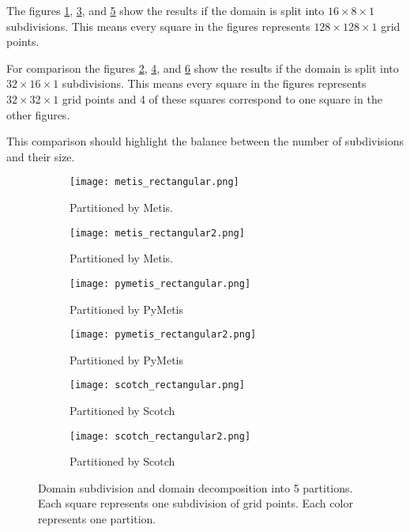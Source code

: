 The figures \ref{fig:metis1}, \ref{fig:pymetis1}, and \ref{fig:scotch1} show the results if the domain is split into $16 \times 8 \times 1$ subdivisions.
This means every square in the figures represents $128 \times 128 \times 1$ grid points.

For comparison the figures \ref{fig:metis2}, \ref{fig:pymetis2}, and \ref{fig:scotch2} show the results if the domain is split into $32 \times 16 \times 1$ subdivisions.
This means every square in the figures represents $32 \times 32 \times 1$ grid points and 4 of these squares correspond to one square in the other figures.

This comparison should highlight the balance between the number of subdivisions and their size.

\begin{figure}[!htbp]
\centering
\begin{subfigure}{0.6\textwidth}
  \centering
  \texttt{[image: metis\_rectangular.png]}
  \caption{Partitioned by Metis.}
  \label{fig:metis1}
\end{subfigure}%
\begin{subfigure}{0.6\textwidth}
  \centering
  \texttt{[image: metis\_rectangular2.png]}
  \caption{Partitioned by Metis.}
  \label{fig:metis2}
\end{subfigure}

\begin{subfigure}{0.6\textwidth}
  \centering
  \texttt{[image: pymetis\_rectangular.png]}
  \caption{Partitioned by PyMetis}
  \label{fig:pymetis1}
\end{subfigure}%
\begin{subfigure}{0.6\textwidth}
  \centering
  \texttt{[image: pymetis\_rectangular2.png]}
  \caption{Partitioned by PyMetis}
  \label{fig:pymetis2}
\end{subfigure}

\begin{subfigure}{0.6\textwidth}
  \centering
  \texttt{[image: scotch\_rectangular.png]}
  \caption{Partitioned by Scotch}
  \label{fig:scotch1}
\end{subfigure}%
\begin{subfigure}{0.6\textwidth}
  \centering
  \texttt{[image: scotch\_rectangular2.png]}
  \caption{Partitioned by Scotch}
  \label{fig:scotch2}
\end{subfigure}

\caption{Domain subdivision and domain decomposition into 5 partitions. Each square represents one subdivision of grid points. Each color represents one partition.}
\label{fig:rectangular1}
\end{figure}

